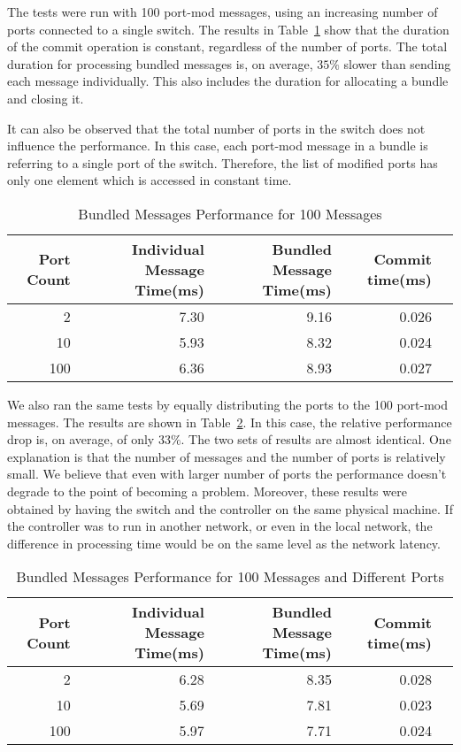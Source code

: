 The tests were run with 100 port-mod messages, using an increasing number of ports connected to a single
switch. The results in Table~\ref{tbl:bundleperf} show that the duration of the commit operation is constant,
regardless of the number of ports. The total duration for processing bundled messages is, on average,
$35\%$ slower than sending each message individually. This also includes the duration for allocating
a bundle and closing it.

It can also be observed that the total number of ports in the switch does not influence the performance.
In this case, each port-mod message in a bundle is referring to a single port of the switch. Therefore, the
list of modified ports has only one element which is accessed in constant time.

\begin{table}[h]
  \centering
  \begin{tabular}{rrrrr}
    \toprule
      Port Count & Individual Message Time(ms) & Bundled Message Time(ms) & Commit time(ms) \\
    \midrule
        2 & 7.30 & 9.16 & 0.026 \\
       10 & 5.93 & 8.32 & 0.024 \\
       100 & 6.36 & 8.93 & 0.027 \\
    \bottomrule
  \end{tabular}
  \caption{Bundled Messages Performance for 100 Messages}
    \label{tbl:bundleperf}
\end{table}

We also ran the same tests by equally distributing the ports to the 100 port-mod messages. The results
are shown in Table~\ref{tbl:bundleperf2}. In this case, the relative performance drop is, on average, of only $33\%$.
The two sets of results are almost identical. One explanation is that the number of messages and the number of
ports is relatively small. We believe that even with larger number of ports the performance doesn't degrade
to the point of becoming a problem. Moreover, these results were obtained by having the switch and the controller
on the same physical machine. If the controller was to run in another network, or even in the local network,
the difference in processing time would be on the same level as the network latency.

\begin{table}[h]
  \centering
  \begin{tabular}{rrrrr}
    \toprule
      Port Count & Individual Message Time(ms) & Bundled Message Time(ms) & Commit time(ms) \\
    \midrule
        2 & 6.28 & 8.35 & 0.028 \\
       10 & 5.69 & 7.81 & 0.023 \\
       100 & 5.97 & 7.71 & 0.024 \\
    \bottomrule
  \end{tabular}
  \caption{Bundled Messages Performance for 100 Messages and Different Ports}
    \label{tbl:bundleperf2}
\end{table}

